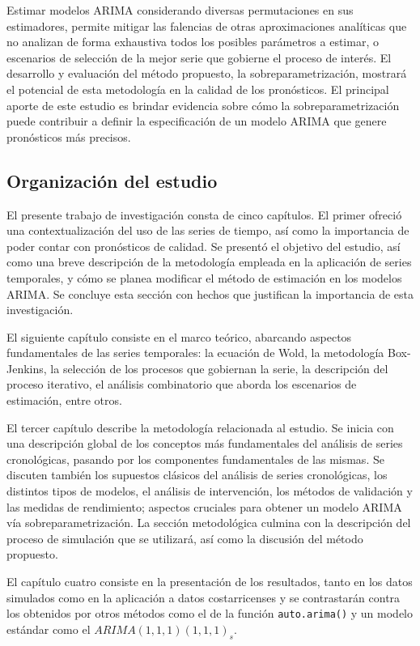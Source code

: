 \documentclass[
]{article}
\begin{document}
Estimar modelos ARIMA considerando diversas permutaciones en sus
estimadores, permite mitigar las falencias de otras aproximaciones
analíticas que no analizan de forma exhaustiva todos los posibles
parámetros a estimar, o escenarios de selección de la mejor serie que
gobierne el proceso de interés. El desarrollo y evaluación del método
propuesto, la sobreparametrización, mostrará el potencial de esta
metodología en la calidad de los pronósticos. El principal aporte de
este estudio es brindar evidencia sobre cómo la sobreparametrización
puede contribuir a definir la especificación de un modelo ARIMA que
genere pronósticos más precisos.

\subsection{Organización del estudio}

El presente trabajo de investigación consta de cinco capítulos. El
primer ofreció una contextualización del uso de las series de tiempo,
así como la importancia de poder contar con pronósticos de calidad. Se
presentó el objetivo del estudio, así como una breve descripción de la
metodología empleada en la aplicación de series temporales, y cómo se
planea modificar el método de estimación en los modelos ARIMA. Se
concluye esta sección con hechos que justifican la importancia de esta
investigación.

El siguiente capítulo consiste en el marco teórico, abarcando aspectos
fundamentales de las series temporales: la ecuación de Wold, la
metodología Box-Jenkins, la selección de los procesos que gobiernan la
serie, la descripción del proceso iterativo, el análisis combinatorio
que aborda los escenarios de estimación, entre otros.

El tercer capítulo describe la metodología relacionada al estudio. Se
inicia con una descripción global de los conceptos más fundamentales del
análisis de series cronológicas, pasando por los componentes
fundamentales de las mismas. Se discuten también los supuestos clásicos
del análisis de series cronológicas, los distintos tipos de modelos, el
análisis de intervención, los métodos de validación y las medidas de
rendimiento; aspectos cruciales para obtener un modelo ARIMA vía
sobreparametrización. La sección metodológica culmina con la descripción
del proceso de simulación que se utilizará, así como la discusión del
método propuesto.

El capítulo cuatro consiste en la presentación de los resultados, tanto
en los datos simulados como en la aplicación a datos costarricenses y se
contrastarán contra los obtenidos por otros métodos como el de la
función \texttt{auto.arima()} y un modelo estándar como el
\(ARIMA(1,1,1)(1,1,1)_s\).
\end{document}
